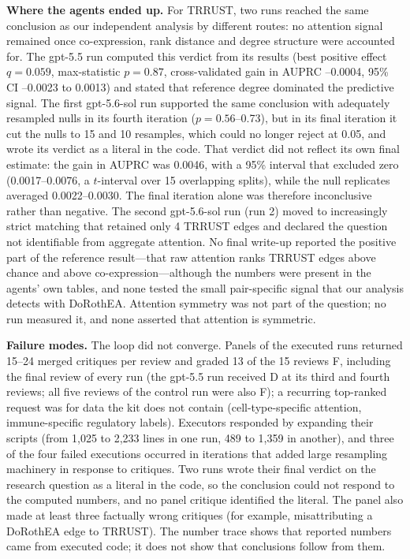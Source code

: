\textbf{Where the agents ended up.} For TRRUST, two runs reached the same conclusion as our independent analysis by different routes: no attention signal remained once co-expression, rank distance and degree structure were accounted for. The gpt-5.5 run computed this verdict from its results (best positive effect $q=0.059$, max-statistic $p=0.87$, cross-validated gain in AUPRC --0.0004, 95\% CI --0.0023 to 0.0013) and stated that reference degree dominated the predictive signal. The first gpt-5.6-sol run supported the same conclusion with adequately resampled nulls in its fourth iteration ($p=0.56$--0.73), but in its final iteration it cut the nulls to 15 and 10 resamples, which could no longer reject at 0.05, and wrote its verdict as a literal in the code. That verdict did not reflect its own final estimate: the gain in AUPRC was 0.0046, with a 95\% interval that excluded zero (0.0017--0.0076, a $t$-interval over 15 overlapping splits), while the null replicates averaged 0.0022--0.0030. The final iteration alone was therefore inconclusive rather than negative. The second gpt-5.6-sol run (run 2) moved to increasingly strict matching that retained only 4 TRRUST edges and declared the question not identifiable from aggregate attention. No final write-up reported the positive part of the reference result---that raw attention ranks TRRUST edges above chance and above co-expression---although the numbers were present in the agents' own tables, and none tested the small pair-specific signal that our analysis detects with DoRothEA. Attention symmetry was not part of the question; no run measured it, and none asserted that attention is symmetric.

\textbf{Failure modes.} The loop did not converge. Panels of the executed runs returned 15--24 merged critiques per review and graded 13 of the 15 reviews F, including the final review of every run (the gpt-5.5 run received D at its third and fourth reviews; all five reviews of the control run were also F); a recurring top-ranked request was for data the kit does not contain (cell-type-specific attention, immune-specific regulatory labels). Executors responded by expanding their scripts (from 1,025 to 2,233 lines in one run, 489 to 1,359 in another), and three of the four failed executions occurred in iterations that added large resampling machinery in response to critiques. Two runs wrote their final verdict on the research question as a literal in the code, so the conclusion could not respond to the computed numbers, and no panel critique identified the literal. The panel also made at least three factually wrong critiques (for example, misattributing a DoRothEA edge to TRRUST). The number trace shows that reported numbers came from executed code; it does not show that conclusions follow from them.
